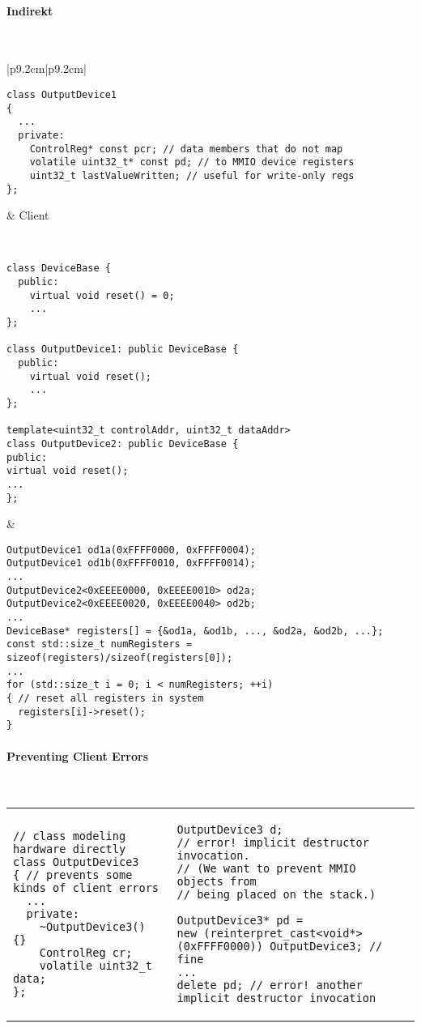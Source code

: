 \paragraph{Indirekt}~
\\
\begin{tabular}{|p{9.2cm}|p{9.2cm}|}
\begin{lstlisting}
class OutputDevice1
{
  ...
  private:
    ControlReg* const pcr; // data members that do not map
    volatile uint32_t* const pd; // to MMIO device registers
    uint32_t lastValueWritten; // useful for write-only regs
};
\end{lstlisting}
&
Client

\\
\hline
\begin{lstlisting}
class DeviceBase {
  public:
    virtual void reset() = 0;
    ...
};

class OutputDevice1: public DeviceBase {
  public:
    virtual void reset();
    ...
};

template<uint32_t controlAddr, uint32_t dataAddr>
class OutputDevice2: public DeviceBase {
public:
virtual void reset();
...
};
\end{lstlisting}
& 
\begin{lstlisting}
OutputDevice1 od1a(0xFFFF0000, 0xFFFF0004);
OutputDevice1 od1b(0xFFFF0010, 0xFFFF0014);
...
OutputDevice2<0xEEEE0000, 0xEEEE0010> od2a;
OutputDevice2<0xEEEE0020, 0xEEEE0040> od2b;
...
DeviceBase* registers[] = {&od1a, &od1b, ..., &od2a, &od2b, ...};
const std::size_t numRegisters =
sizeof(registers)/sizeof(registers[0]);
...
for (std::size_t i = 0; i < numRegisters; ++i)
{ // reset all registers in system
  registers[i]->reset();
}
\end{lstlisting}
\end{tabular}

\paragraph{Preventing Client Errors}~

\begin{tabular}{|p{9.2cm}|p{9.2cm}|}
\begin{lstlisting}
// class modeling hardware directly
class OutputDevice3 
{ // prevents some kinds of client errors
  ...
  private:
    ~OutputDevice3() {}
    ControlReg cr;
    volatile uint32_t data;
};
\end{lstlisting}
& 
\begin{lstlisting}
OutputDevice3 d; 
// error! implicit destructor invocation.
// (We want to prevent MMIO objects from
// being placed on the stack.)

OutputDevice3* pd =
new (reinterpret_cast<void*>(0xFFFF0000)) OutputDevice3; // fine
...
delete pd; // error! another implicit destructor invocation
\end{lstlisting}
\end{tabular}
